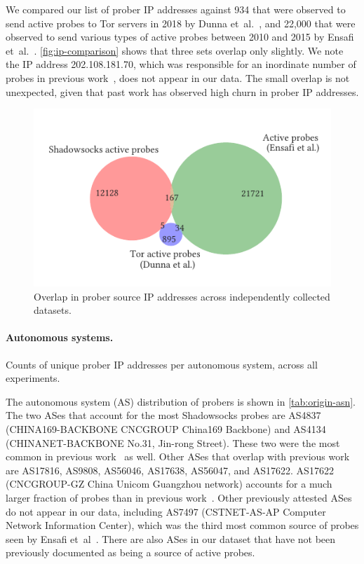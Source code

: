 \documentclass[sigconf,letterpaper]{acmart}
\begin{document}
We compared our list of prober IP addresses against
934 that were observed to send active probes to Tor servers in 2018 by Dunna et~al.~\cite{Dunna2018a},
and 22,000 that were observed to send various types of active probes between 2010 and 2015 by Ensafi et~al.~\cite{Ensafi2015b}.
\autoref{fig:ip-comparison} shows that three sets overlap only slightly.
We note the IP address 202.108.181.70,
which was responsible for an inordinate number of probes in previous work~\cite[\S 5.3]{Ensafi2015b},
does not appear in our data.
The small overlap is not unexpected, given that past work has observed high churn in prober IP addresses.

\begin{figure}
    \includegraphics[width=\columnwidth]{./figures/comparison_with_other_probe_source_datasets.pdf}
    \caption{
        Overlap in prober source IP addresses across independently collected datasets.
    }
    \label{fig:ip-comparison}
\end{figure}

\paragraph{Autonomous systems.}

\begin{table}
    \caption{
    Counts of unique prober IP addresses per autonomous system, across all experiments.
    }
    \label{tab:origin-asn}

\end{table}

The autonomous system (AS) distribution of probers is shown in \autoref{tab:origin-asn}.
The two ASes that account for the most Shadowsocks probes are
AS4837 (CHINA169-BACKBONE CNCGROUP China169 Backbone) and AS4134 (CHINANET-BACK\-BONE No.31, Jin-rong Street).
These two were the most common in previous work~\cite{Ensafi2015b, Winter2012a}
as well.
Other ASes that overlap with previous work are
AS17816, AS9808, AS56046, AS17638, AS56047, and AS17622.
AS17622 (CNCGROUP-GZ China Unicom Guangzhou network)
accounts for a much larger fraction of probes than in previous work~\cite[Figure~7]{Ensafi2015b}.
Other previously attested ASes do not appear in our data,
including AS7497 (CSTNET-AS-AP Computer Network Information Center),
which was the third most common source of probes seen by Ensafi et~al~\cite{Ensafi2015b}.
There are also ASes in our dataset
that have not been previously documented as being a source of active probes.
\end{document}
